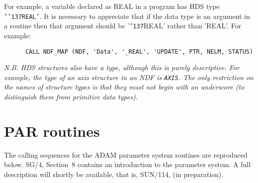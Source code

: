 \documentclass[twoside,11pt]{article}
\renewcommand{\_}{{\tt\char'137}}
\newcommand{\xref}[3]{#1}
\newcommand{\xlabel}[1]{}
\begin{document}
For example, a variable declared as REAL in a program has HDS type
{\tt '\_REAL'}.
It is necessary to appreciate that if the data type is
an argument in a
routine then that  argument should be '\_REAL' rather than 'REAL'.
For example:
\begin{verbatim}
      CALL NDF_MAP (NDF, 'Data', '_REAL', 'UPDATE', PTR, NELM, STATUS)
\end{verbatim}

{\sl N.B. HDS structures also have a type, although this is purely descriptive.
For example, the type of an axis  structure in an NDF is {\tt AXIS}.
The only restriction on the names of structure types is that they
must not begin with an underscore (to distinguish them from
primitive data types).}

\newpage
\section{PAR routines\label{apxpar}\xlabel{par_routines}}

The calling sequences for the ADAM  parameter system routines are
reproduced below. \xref{SG/4}{sg4}{}, Section~8  contains an introduction to
the parameter system.
A full description will shortly be available, that is,
\xref{SUN/114}{sun114}{}, (in preparation).
\end{document}
